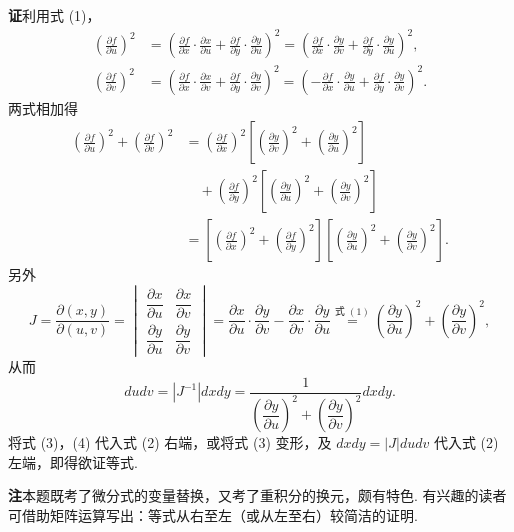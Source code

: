 \documentclass[UTF8, 12pt, fontset=fandol, oneside]{ctexart}
\begin{document}
\noindent\textbf{证}\quad 利用式 (1)，
\[
\begin{aligned}
\left(\frac{\partial f}{\partial u}\right)^2
&=\left(\frac{\partial f}{\partial x}\cdot\frac{\partial x}{\partial u}
+\frac{\partial f}{\partial y}\cdot\frac{\partial y}{\partial u}\right)^2
=\left(\frac{\partial f}{\partial x}\cdot\frac{\partial y}{\partial v}
+\frac{\partial f}{\partial y}\cdot\frac{\partial y}{\partial u}\right)^2,\\
\left(\frac{\partial f}{\partial v}\right)^2
&=\left(\frac{\partial f}{\partial x}\cdot\frac{\partial x}{\partial v}
+\frac{\partial f}{\partial y}\cdot\frac{\partial y}{\partial v}\right)^2
=\left(-\frac{\partial f}{\partial x}\cdot\frac{\partial y}{\partial u}
+\frac{\partial f}{\partial y}\cdot\frac{\partial y}{\partial v}\right)^2.
\end{aligned}
\]
两式相加得
\[
\begin{aligned}
\left(\frac{\partial f}{\partial u}\right)^2+
\left(\frac{\partial f}{\partial v}\right)^2
&=\left(\frac{\partial f}{\partial x}\right)^2
\left[\left(\frac{\partial y}{\partial v}\right)^2+
\left(\frac{\partial y}{\partial u}\right)^2\right]\\
&\quad+\left(\frac{\partial f}{\partial y}\right)^2
\left[\left(\frac{\partial y}{\partial u}\right)^2+
\left(\frac{\partial y}{\partial v}\right)^2\right]\\
&=\left[\left(\frac{\partial f}{\partial x}\right)^2+
\left(\frac{\partial f}{\partial y}\right)^2\right]
\left[\left(\frac{\partial y}{\partial u}\right)^2+
\left(\frac{\partial y}{\partial v}\right)^2\right].
\end{aligned}
\tag{3}
\]
另外
\[
J=\frac{\partial(x,y)}{\partial(u,v)}
=\begin{vmatrix}
\dfrac{\partial x}{\partial u}&\dfrac{\partial x}{\partial v}\\
\dfrac{\partial y}{\partial u}&\dfrac{\partial y}{\partial v}
\end{vmatrix}
=\frac{\partial x}{\partial u}\cdot\frac{\partial y}{\partial v}
-\frac{\partial x}{\partial v}\cdot\frac{\partial y}{\partial u}
\stackrel{\text{式 }(1)}=
\left(\frac{\partial y}{\partial u}\right)^2+
\left(\frac{\partial y}{\partial v}\right)^2,
\]
从而
\[
dudv=|J^{-1}|dxdy=
\frac1{\left(\dfrac{\partial y}{\partial u}\right)^2+
\left(\dfrac{\partial y}{\partial v}\right)^2}dxdy. \tag{4}
\]
将式 (3)，(4) 代入式 (2) 右端，或将式 (3) 变形，及 $dxdy=|J|dudv$ 代入式 (2) 左端，即得欲证等式.

\noindent\textbf{注}\quad 本题既考了微分式的变量替换，又考了重积分的换元，颇有特色. 有兴趣的读者可借助矩阵运算写出：等式从右至左（或从左至右）较简洁的证明.
\end{document}
